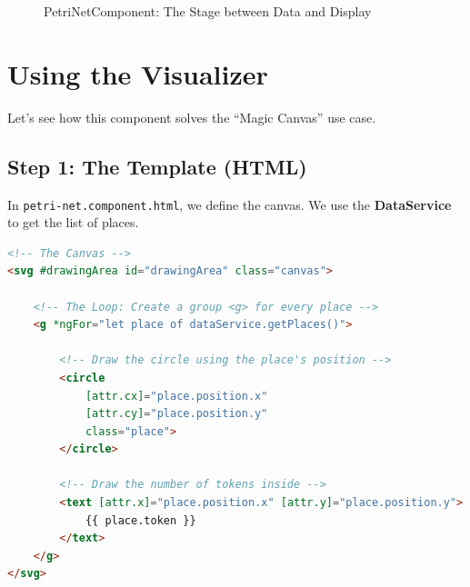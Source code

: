\documentclass[a4paper,11pt,oneside]{report}
\begin{document}
\begin{figure}[H]
\centering
{}
\caption{PetriNetComponent: The Stage between Data and Display}
\label{fig:visualizer-overview}
\end{figure}

\section{Using the Visualizer}

Let's see how this component solves the ``Magic Canvas'' use case.

\subsection{Step 1: The Template (HTML)}

In \texttt{petri-net.component.html}, we define the canvas. We use the \textbf{DataService} to get the list of places.

\begin{lstlisting}[language=HTML]
<!-- The Canvas -->
<svg #drawingArea id="drawingArea" class="canvas">
    
    <!-- The Loop: Create a group <g> for every place -->
    <g *ngFor="let place of dataService.getPlaces()">
        
        <!-- Draw the circle using the place's position -->
        <circle 
            [attr.cx]="place.position.x"
            [attr.cy]="place.position.y"
            class="place">
        </circle>

        <!-- Draw the number of tokens inside -->
        <text [attr.x]="place.position.x" [attr.y]="place.position.y">
            {{ place.token }}
        </text>
    </g>
</svg>
\end{lstlisting}
\end{document}

